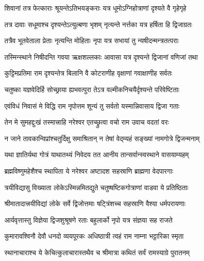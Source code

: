 \twolineshloka
{शिवानां तत्र फेत्काराः श्रूयन्तेऽतिभयङ्कराः}
{यत्र धूमोऽग्निहोत्राणां दृश्यते वै गृहेगृहे}%

\twolineshloka
{तत्र दावाः सधूमाश्च दृश्यन्तेऽत्युल्बणा भृशम्}
{नृत्यन्ते नर्त्तका यत्र हर्षिता हि द्विजाग्रतः}%

\twolineshloka
{तत्रैव भूतवेताला प्रेताः नृत्यन्ति मोहिताः}
{नृपा यत्र सभायां तु न्यषीदन्मन्त्रतत्पराः}%

\twolineshloka
{तस्मिन्स्थाने निषीदन्ति गवया ऋक्षशल्लकाः}
{आवासा यत्र दृश्यन्ते द्विजानां वणिजां तथा}%

\twolineshloka
{कुट्टिमप्रतिमा राम दृश्यन्तेत्र बिलानि वै}
{कोटराणीह वृक्षाणां गवाक्षाणीह सर्वतः}%

\twolineshloka
{चतुष्का यज्ञवेदिर्हि सोच्छ्राया ह्यभवत्पुरा}
{तेऽत्र वल्मीकनिचयैर्दृश्यन्ते परिवेष्टिताः}%

\twolineshloka
{एवंविधं निवासं मे विद्धि राम नृपोत्तम}
{शून्यं तु सर्वतो यस्मान्निवासाय द्विजा गताः}%

\twolineshloka
{तेन मे सुमहद्दुःखं तस्मात्त्राहि नरेश्वर}
{एतच्छ्रुत्वा वचो राम उवाच वदतां वरः}%


\twolineshloka
{न जाने तावकान्विप्रांश्चतुर्दिक्षु समाश्रितान्}
{न तेषां वेद्म्यहं सङ्ख्यां नामगोत्रे द्विजन्मनाम्}%

\twolineshloka
{यथा ज्ञातिर्यथा गोत्रं याथातथ्यं निवेदय}
{तत आनीय तान्सर्वान्स्वस्थाने वासयाम्यहम्}%


\twolineshloka
{ब्रह्मविष्णुमहेशैश्च स्थापिता ये नरेश्वर}
{अष्टादश सहस्राणि ब्राह्मणा वेदपारगाः}%

\twolineshloka
{त्रयीविद्यासु विख्याता लोकेऽस्मिन्नमितद्युते}
{चतुष्षष्टिकगोत्राणां वाडवा ये प्रतिष्ठिताः}%

\twolineshloka
{श्रीमातादात्त्रयीविद्यां लोके सर्वे द्विजोत्तमाः}
{षट्त्रिंशच्च सहस्राणि वैश्या धर्मपरायणाः}%

\twolineshloka
{आर्यवृत्तास्तु विज्ञेया द्विजशुश्रूषणे रताः}
{बहुलार्को नृपो यत्र संज्ञया सह राजते}%

\twolineshloka
{कुमारावश्विनौ देवौ धनदो व्ययपूरकः}
{अधिष्ठात्री त्वहं राम नाम्ना भट्टारिका स्मृता}%


\twolineshloka
{स्थानाचाराश्च ये केचित्कुलाचारास्तथैव च}
{श्रीमात्रा कथितं सर्वं रामस्याग्रे पुरातनम्}%

